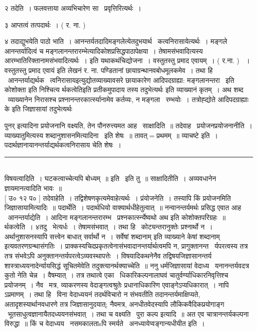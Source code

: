 \documentclass[11pt, openany]{book}
\begin{document}
\begin{multicols}{2}
२ तदेति~। फलवत्ताया अव्यभिचारेण सा \textendash\ प्रवृत्तिरित्यर्थः~। 

३ आप्तत्वं तत्पदार्थः~। ( र. ना. ) 

४ तदाद्युभयेति पाठो भाति~। आनन्तर्यतदादिमङ्गलेत्येतदुभयार्थ \textendash\ कत्वनिरासायेत्यर्थः~। मङ्गले आनन्तर्यादित्वं च मङ्गलानन्तरारम्भेत्यादिकोशप्रसिद्धपाठापेक्षया~। तेषामसंभवादित्यस्य आरम्भातिरिक्तानामसंभवादित्यर्थः~। इति यथाकथंचिद्योजना~। वस्तुतस्तु प्रमाद एवायम्~। ( र.ना. ) ~। वस्तुतस्तु प्रमाद एवायं इति लेखनं र. ना. पण्डितानां छायाग्रन्थानवबोधमूलकमेव~। तथा हि \textendash\ {\qt आनन्तर्याद्यर्थक \textendash\ त्वनिरासाय}इत्युद्योतव्याख्यावसरे छायाकारेण आदिपदग्राह्या: मङ्गलानन्तरा \textendash\ इति कोशोक्ता इति निश्चित्य {\qt र्थकत्वेति}इति प्रतीकमुपादाय तस्य {\qt तदुभेत्यर्थः} इति व्याख्यानं कृतम्~। अथ शब्द \textendash\ व्याख्यानेन निरासश्च प्रश्नानन्तरकार्त्स्यानामेव कर्तव्यः, न मङ्गला \textendash\ रम्भयोः~। तत्रोह्द्योते आदिपदग्राह्याः के इति जिज्ञासायां तदुभेत्यर्थः

\columnbreak

\noindent
पुनर् इत्यादिना प्रयोजनानि वक्ष्यति, तेन पौनरुत्त्यमत आह \textendash\ साक्षादिति~॥ तदेवाह \textendash\ प्रयोजनप्रयोजनानीति~। व्याख्यातुमित्यस्य शब्दानुशासनमित्यादिना \textendash\ इति शेषः~॥ तावत्$=$प्रथमम्~॥ व्याचष्टे इति~। पदार्थज्ञानायानन्तर्याद्यर्थकत्वनिरासाय चेति शेषः~।

\noindent
\rule{1\linewidth}{0.5pt}\\

विषयत्वादिति~। घटकत्वाच्चेत्यपि बोध्यम्~॥ इति \textendash\ इति तु~॥ साक्षादितीति~। अव्यवधानेन ज्ञायमानत्वादिति भावः~॥\\

 [ उ० १२ प० ] तदेवाहेति~। तद्विशेषणकृत्यमेवाहेत्यर्थः~। प्रंयोजनेति~। तस्यापि किं प्रयोजनमिति जिज्ञासायामित्यादिः~॥ पदार्थेति~। पदार्थधियो वाक्यार्थधीहेतुत्वात्~॥ नन्वानन्तर्यमर्थः प्रसिद्ध एवात आह \textendash\ आनन्तर्याद्येति~। आदिना {\qt मङ्गलानन्तरारम्भ \textendash\ प्रश्नकार्त्स्न्येष्वथो अथ} इति कोशोक्तपरिग्रहः~॥ र्थकत्वेति~। ४तदु \textendash\ भेत्यर्धः~। तेषामसंभवात्~। तथा हि \textendash\ कोट्यन्तरानुक्तेः प्रश्नार्थो न~। अर्थानुशासनस्यापि सत्त्वेन बाधात् सर्वार्थो न~। {\qt सर्वेषां शब्दानाम्} इति व्याख्याने {\qt केषां शब्दानाम्} इत्यवतरणग्रन्थासंगतिः~। प्राक्कस्यचिदप्रकृतत्वेनासंभवादानन्तर्यार्थत्वमपि न, प्रागुक्तानन्त \textendash\ र्यपरत्वस्य तत्र तत्र संभवेऽपि अनुक्तानन्तर्यपरत्वेऽव्यवस्थापत्तेः~। विषयादिकथनेनैव तद्विषयजिज्ञासानन्तर्य शास्त्राध्ययनादेर्न्यायसिद्धं सूचितमेवेति तदुक्त्यानर्थक्याच्चेति~॥ ननु धर्मजिज्ञासायां वेदाध्य \textendash\ यनानन्तर्यवदत्र कुतो नेति चेन्न~। वैषम्यात्~। तत्र तथात्वे एका \textendash\ धिकारिकल्पनालाघवं चातुर्वर्ण्याधिकारनिवृत्तिश्च प्रयोजनम्~। नैव \textendash\ मत्र, व्याकरणस्य वेदाङ्गत्वश्रुतेः प्रधानाधिकारिण एवाङ्गेऽप्यधिकारात्~। नापि ऽप्रमाणम्~। तथा हि \textendash\ विना वेदाध्ययनं तदर्थविचारो न संभवतीति तदानन्तर्यमाक्षिप्यते, अतादृशस्यार्थानवधारणे तत्र जिज्ञासानुदयात्; नैवमत्र, अनधीतवेदस्यापि लौकिकवैदिकप्रयोगाङ्ग \textendash\ भूतसाधुत्वज्ञानायैतदध्ययनसंभवात्~। तथा च वक्ष्यति \textendash\ पुरा कल्प इत्यादि~॥ अत एव चात्रानन्तर्यकल्पना विरुद्धा~॥ किं च वेदाध्यय \textendash\ नसमकालताsपि स्मर्यते \textendash\ अनध्यायेप्वङ्गान्यधीयीत इति~।


\end{multicols}
\end{document}
